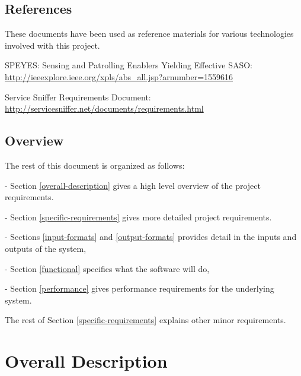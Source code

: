 \documentclass[titlepage]{article}
\begin{document}

\subsection{References%
  \label{references}%
}

These documents have been used as reference materials for various technologies involved with this project.
%
\begin{itemize*}
	\item SPEYES: Sensing and Patrolling Enablers Yielding Effective SASO: \url{http://ieeexplore.ieee.org/xpls/abs_all.jsp?arnumber=1559616}
	\item Service Sniffer Requirements Document: \url{http://servicesniffer.net/documents/requirements.html}
\end{itemize*}



\subsection{Overview%
  \label{overview}%
}

The rest of this document is organized as follows: 
\begin{itemize*}
	\item[-]Section \ref{overall-description} gives a high level overview of the project requirements.  
	\item[-]Section \ref{specific-requirements} gives more detailed project requirements.  
	\item[-]Sections \ref{input-formats} and \ref{output-formats} provides detail in the inputs and outputs of the system, 
	\item[-]Section \ref{functional} specifies what the software will do, 
	\item[-]Section \ref{performance} gives performance requirements for the underlying system.
\end{itemize*}
The rest of Section \ref{specific-requirements} explains other minor requirements.



\section{Overall Description%
  \label{overall-description}%
}
\end{document}
